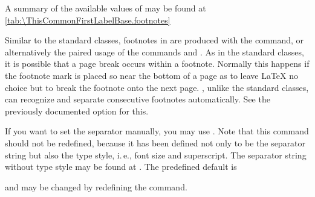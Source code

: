 A summary of the available  values of  may
be found at \autoref{tab:\ThisCommonFirstLabelBase.footnotes}%
%
%
\EndIndexGroup


\begin{Declaration}
\end{Declaration}%
Similar to the standard classes, footnotes in {\KOMAScript} are produced with
the  command, or alternatively the paired usage of the
commands  and .  As in the standard
classes, it is possible that a page break occurs within a footnote. Normally
this happens if the footnote mark is placed so near the bottom of a page as to
leave {\LaTeX} no choice but to break the footnote onto the next page.
\KOMAScript%
, unlike the standard classes, can recognize and separate consecutive
footnotes
automatically. See
the previously documented option
 for this.

If you want to set the separator manually, you may use
. Note that this command should not be
redefined, because it has been defined not only to be the separator string but
also the type style, i.\,e., font size and superscript. The separator string
without type style may be found at . The predefined default
is
\begin{lstcode}
  \newcommand*{\multfootsep}{,}
\end{lstcode}
and may be changed by redefining the command.

